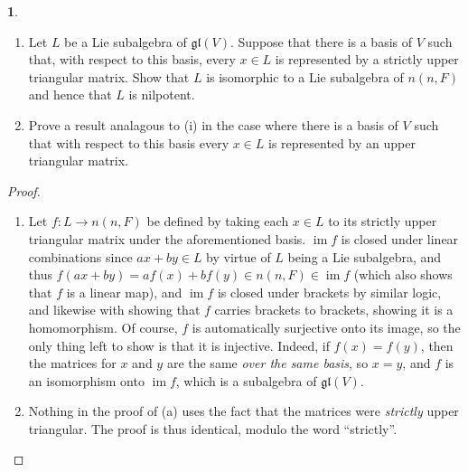 \documentclass[12pt]{article}
\DeclareMathOperator{\im}{im}
\newcommand{\gl}{\mathfrak{gl}}
\theoremstyle{definition}
\newtheorem{ex}{}
\begin{document}
\begin{ex}\
	\begin{enumerate}[label=(\alph*)]
		\item Let $L$ be a Lie subalgebra of $\gl(V)$.
		      Suppose that there is a basis of $V$ such that, with respect to this basis, every $x \in L$ is represented by a strictly upper triangular matrix.
		      Show that $L$ is isomorphic to a Lie subalgebra of $n(n, F)$ and hence that $L$ is nilpotent.
		\item Prove a result analagous to (i) in the case where there is a basis of $V$ such that with respect to this basis every $x \in L$ is represented by an upper triangular matrix.
	\end{enumerate}
\end{ex}
\begin{proof}\
	\begin{enumerate}[label=(\alph*)]
		\item Let $f : L \to n(n,F)$ be defined by taking each $x \in L$ to its strictly upper triangular matrix under the aforementioned basis.
		      $\im f$ is closed under linear combinations since $ax + by \in L$ by virtue of $L$ being a Lie subalgebra, and thus $f(ax + by) = af(x) + bf(y) \in n(n,F) \in \im f$ (which also shows that $f$ is a linear map), and $\im f$ is closed under brackets by similar logic, and likewise with showing that $f$ carries brackets to brackets, showing it is a homomorphism.
		      Of course, $f$ is automatically surjective onto its image, so the only thing left to show is that it is injective.
		      Indeed, if $f(x) = f(y)$, then the matrices for $x$ and $y$ are the same \textit{over the same basis}, so $x = y$, and $f$ is an isomorphism onto $\im f$, which is a subalgebra of $\gl(V)$.
		\item Nothing in the proof of (a) uses the fact that the matrices were \textit{strictly} upper triangular.
		      The proof is thus identical, modulo the word ``strictly''.
	\end{enumerate}
\end{proof}
\end{document}
